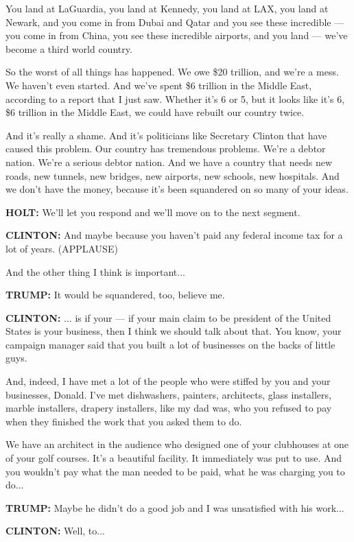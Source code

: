 You land at LaGuardia, you land at Kennedy, you land at LAX, you land at
Newark, and you come in from Dubai and Qatar and you see these
incredible --- you come in from China, you see these incredible
airports, and you land --- we've become a third world country.

So the worst of all things has happened. We owe \$20 trillion, and we're
a mess. We haven't even started. And we've spent \$6 trillion in the
Middle East, according to a report that I just saw. Whether it's 6 or 5,
but it looks like it's 6, \$6 trillion in the Middle East, we could have
rebuilt our country twice.

And it's really a shame. And it's politicians like Secretary Clinton
that have caused this problem. Our country has tremendous problems.
We're a debtor nation. We're a serious debtor nation. And we have a
country that needs new roads, new tunnels, new bridges, new airports,
new schools, new hospitals. And we don't have the money, because it's
been squandered on so many of your ideas.

\textbf{HOLT:} We'll let you respond and we'll move on to the next
segment.

\textbf{CLINTON:} And maybe because you haven't paid any federal income
tax for a lot of years. (APPLAUSE)

And the other thing I think is important...

\textbf{TRUMP:} It would be squandered, too, believe me.

\textbf{CLINTON:} ... is if your --- if your main claim to be president
of the United States is your business, then I think we should talk about
that. You know, your campaign manager said that you built a lot of
businesses on the backs of little guys.

And, indeed, I have met a lot of the people who were stiffed by you and
your businesses, Donald. I've met dishwashers, painters, architects,
glass installers, marble installers, drapery installers, like my dad
was, who you refused to pay when they finished the work that you asked
them to do.

We have an architect in the audience who designed one of your clubhouses
at one of your golf courses. It's a beautiful facility. It immediately
was put to use. And you wouldn't pay what the man needed to be paid,
what he was charging you to do...

\textbf{TRUMP:} Maybe he didn't do a good job and I was unsatisfied with
his work...

\textbf{CLINTON:} Well, to...


